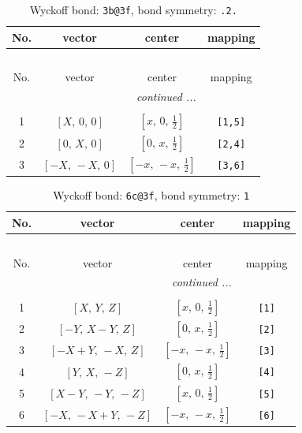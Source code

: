 \documentclass[fleqn,8pt]{jsarticle}
\begin{document}
\renewcommand{\arraystretch}{1.2}
\begin{longtable}{cccc}
\caption{Wyckoff bond: {\tt 3b@3f}, bond symmetry: {\tt .2.}}
 \\
 \hline \hline
No. & vector & center & mapping \\ \hline \endfirsthead

\multicolumn{3}{l}{\tablename\ \thetable{}} \\
 \hline \hline
No. & vector & center & mapping \\ \hline \endhead

 \hline \hline
\multicolumn{3}{r}{\footnotesize\it continued ...} \\ \endfoot

 \hline \hline
\multicolumn{3}{r}{} \\ \endlastfoot

1 & $\left[ X,\, 0,\, 0 \right]$ & $\left[ x,\, 0,\, \frac{1}{2} \right]$ & {\tt [1,5]} \\ \hline
2 & $\left[ 0,\, X,\, 0 \right]$ & $\left[ 0,\, x,\, \frac{1}{2} \right]$ & {\tt [2,4]} \\ \hline
3 & $\left[ - X,\, - X,\, 0 \right]$ & $\left[ - x,\, - x,\, \frac{1}{2} \right]$ & {\tt [3,6]} \\
\end{longtable}
\renewcommand{\arraystretch}{1.2}
\begin{longtable}{cccc}
\caption{Wyckoff bond: {\tt 6c@3f}, bond symmetry: {\tt 1}}
 \\
 \hline \hline
No. & vector & center & mapping \\ \hline \endfirsthead

\multicolumn{3}{l}{\tablename\ \thetable{}} \\
 \hline \hline
No. & vector & center & mapping \\ \hline \endhead

 \hline \hline
\multicolumn{3}{r}{\footnotesize\it continued ...} \\ \endfoot

 \hline \hline
\multicolumn{3}{r}{} \\ \endlastfoot

1 & $\left[ X,\, Y,\, Z \right]$ & $\left[ x,\, 0,\, \frac{1}{2} \right]$ & {\tt [1]} \\ \hline
2 & $\left[ - Y,\, X - Y,\, Z \right]$ & $\left[ 0,\, x,\, \frac{1}{2} \right]$ & {\tt [2]} \\ \hline
3 & $\left[ - X + Y,\, - X,\, Z \right]$ & $\left[ - x,\, - x,\, \frac{1}{2} \right]$ & {\tt [3]} \\ \hline
4 & $\left[ Y,\, X,\, - Z \right]$ & $\left[ 0,\, x,\, \frac{1}{2} \right]$ & {\tt [4]} \\ \hline
5 & $\left[ X - Y,\, - Y,\, - Z \right]$ & $\left[ x,\, 0,\, \frac{1}{2} \right]$ & {\tt [5]} \\ \hline
6 & $\left[ - X,\, - X + Y,\, - Z \right]$ & $\left[ - x,\, - x,\, \frac{1}{2} \right]$ & {\tt [6]} \\
\end{longtable}
\end{document}
